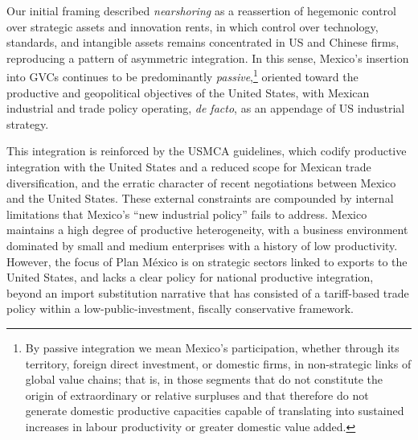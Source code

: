 \documentclass[11pt]{article}
\begin{document}
Our initial framing described \textit{nearshoring} as a reassertion of
hegemonic control over strategic assets and innovation rents, in which
control over technology, standards, and intangible assets remains
concentrated in US and Chinese firms, reproducing a pattern of asymmetric
integration. In this sense, Mexico's insertion into GVCs continues to be
predominantly \textit{passive},\footnote{By passive integration we mean
Mexico's participation, whether through its territory, foreign direct
investment, or domestic firms, in non-strategic links of global value
chains; that is, in those segments that do not constitute the origin of
extraordinary or relative surpluses and that therefore do not generate
domestic productive capacities capable of translating into sustained
increases in labour productivity or greater domestic value added.}
oriented toward the productive and geopolitical objectives of the United
States, with Mexican industrial and trade policy operating, \textit{de
facto}, as an appendage of US industrial strategy.

This integration is reinforced by the USMCA guidelines, which codify
productive integration with the United States and a reduced scope for
Mexican trade diversification, and the erratic character of recent
negotiations between Mexico and the United States. These external
constraints are compounded by internal limitations that Mexico's ``new
industrial policy'' fails to address. Mexico maintains a high degree of
productive heterogeneity, with a business environment dominated by small and
medium enterprises with a history of low productivity. However, the focus
of Plan México is on strategic sectors linked to exports to the United
States, and lacks a clear policy for national productive integration,
beyond an import substitution narrative that has consisted of a
tariff-based trade policy within a low-public-investment, fiscally
conservative framework.
\end{document}
